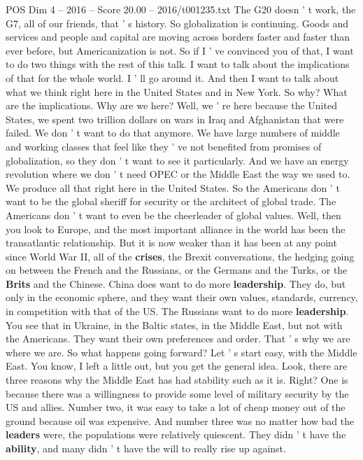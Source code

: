 \begin{textsample}{POS Dim 4 – 2016 – Score 20.00 – 2016/t001235.txt}
The G20 doesn ' t work, the G7, all of our friends, that ' s history.
So globalization is continuing.
Goods and services and people and capital are moving across borders faster and faster than ever before, but Americanization is not.
So if I ' ve convinced you of that, I want to do two things with the rest of this talk.
I want to talk about the implications of that for the whole world.
I ' ll go around it.
And then I want to talk about what we think right here in the United States and in New York.
So why?
What are the implications.
Why are we here?
Well, we ' re here because the United States, we spent two trillion dollars on wars in Iraq and Afghanistan that were failed.
We don ' t want to do that anymore.
We have large numbers of middle and working classes that feel like they ' ve not benefited from promises of globalization, so they don ' t want to see it particularly.
And we have an energy revolution where we don ' t need OPEC or the Middle East the way we used to.
We produce all that right here in the United States.
So the Americans don ' t want to be the global sheriff for security or the architect of global trade.
The Americans don ' t want to even be the cheerleader of global values.
Well, then you look to Europe, and the most important alliance in the world has been the transatlantic relationship.
But it is now weaker than it has been at any point since World War II, all of the \textbf{crises}, the Brexit conversations, the hedging going on between the French and the Russians, or the Germans and the Turks, or the \textbf{Brits} and the Chinese.
China does want to do more \textbf{leadership}.
They do, but only in the economic sphere, and they want their own values, standards, currency, in competition with that of the US.
The Russians want to do more \textbf{leadership}.
You see that in Ukraine, in the Baltic states, in the Middle East, but not with the Americans.
They want their own preferences and order.
That ' s why we are where we are.
So what happens going forward?
Let ' s start easy, with the Middle East.
You know, I left a little out, but you get the general idea.
Look, there are three reasons why the Middle East has had stability such as it is.
Right?
One is because there was a willingness to provide some level of military security by the US and allies.
Number two, it was easy to take a lot of cheap money out of the ground because oil was expensive.
And number three was no matter how bad the \textbf{leaders} were, the populations were relatively quiescent.
They didn ' t have the \textbf{ability}, and many didn ' t have the will to really rise up against.

\end{textsample}
